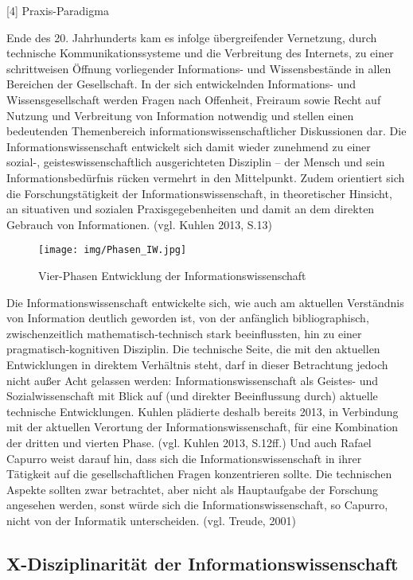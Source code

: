 \documentclass[a4paper,
fontsize=11pt,
oneside,
numbers=noperiodatend,
parskip=half-,
bibliography=totoc,
final
]{scrartcl}
\begin{document}
{[}4{]} Praxis-Paradigma

Ende des 20. Jahrhunderts kam es infolge übergreifender Vernetzung,
durch technische Kommunikationssysteme und die Verbreitung des
Internets, zu einer schrittweisen Öffnung vorliegender Informations- und
Wissensbestände in allen Bereichen der Gesellschaft. In der sich
entwickelnden Informations- und Wissensgesellschaft werden Fragen nach
Offenheit, Freiraum sowie Recht auf Nutzung und Verbreitung von
Information notwendig und stellen einen bedeutenden Themenbereich
informationswissenschaftlicher Diskussionen dar. Die
Informationswissenschaft entwickelt sich damit wieder zunehmend zu einer
sozial-, geisteswissenschaftlich ausgerichteten Disziplin -- der Mensch
und sein Informationsbedürfnis rücken vermehrt in den Mittelpunkt. Zudem
orientiert sich die Forschungstätigkeit der Informationswissenschaft, in
theoretischer Hinsicht, an situativen und sozialen Praxisgegebenheiten
und damit an dem direkten Gebrauch von Informationen. (vgl. Kuhlen 2013,
S.13)

\begin{figure}
\centering
\texttt{[image: img/Phasen\_IW.jpg]}
\caption{Vier-Phasen Entwicklung der Informationswissenschaft}
\end{figure}

Die Informationswissenschaft entwickelte sich, wie auch am aktuellen
Verständnis von Information deutlich geworden ist, von der anfänglich
bibliographisch, zwischenzeitlich mathematisch-technisch stark
beeinflussten, hin zu einer pragmatisch-kognitiven Disziplin. Die
technische Seite, die mit den aktuellen Entwicklungen in direktem
Verhältnis steht, darf in dieser Betrachtung jedoch nicht außer Acht
gelassen werden: Informationswissenschaft als Geistes- und
Sozialwissenschaft mit Blick auf (und direkter Beeinflussung durch)
aktuelle technische Entwicklungen. Kuhlen plädierte deshalb bereits
2013, in Verbindung mit der aktuellen Verortung der
Informationswissenschaft, für eine Kombination der dritten und vierten
Phase. (vgl. Kuhlen 2013, S.12ff.) Und auch Rafael Capurro weist darauf
hin, dass sich die Informationswissenschaft in ihrer Tätigkeit auf die
gesellschaftlichen Fragen konzentrieren sollte. Die technischen Aspekte
sollten zwar betrachtet, aber nicht als Hauptaufgabe der Forschung
angesehen werden, sonst würde sich die Informationswissenschaft, so
Capurro, nicht von der Informatik unterscheiden. (vgl. Treude, 2001)

\subsection*{X-Disziplinarität der
Informationswissenschaft}\label{x-disziplinarituxe4t-der-informationswissenschaft}
\end{document}
